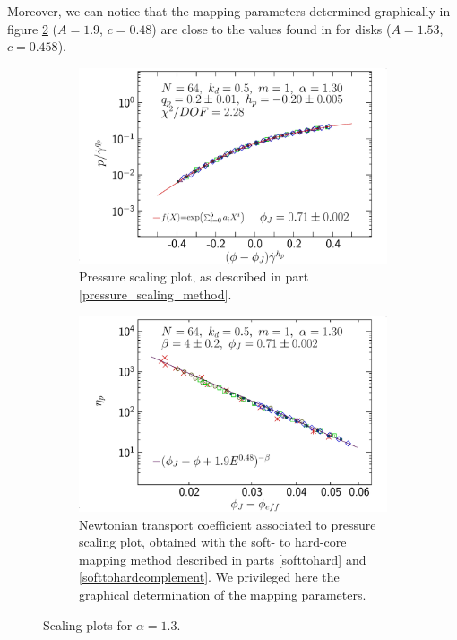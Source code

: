 \documentclass[class=report, float=false, crop=false]{standalone}
\begin{document}
Moreover, we can notice that the mapping parameters determined graphically in figure \ref{etap-phieff_graph_0064_KDk500_Ml100_EL130} ($A=1.9$, $c=0.48$) are close to the values found in \cite{PRL109.108001} for disks ($A=1.53$, $c=0.458$).

\vspace{50pt} %

\begin{figure}[h!]
\centering
    \begin{subfigure}[t]{0.49\textwidth}
        \centering
        \includegraphics[width=\textwidth]{figures/figs/p-dphi-scale_0064_KDk500_Ml100_EL130}
        \caption{Pressure scaling plot, as described in part \ref{pressure_scaling_method}.}
        \label{p-dphi-scale_0064_KDk500_Ml100_EL130}
    \end{subfigure}
    \hfill
    \begin{subfigure}[t]{0.49\textwidth}
        \centering
        \includegraphics[width=\textwidth]{figures/figs/etap-phieff_graph_0064_KDk500_Ml100_EL130}
        \caption{Newtonian transport coefficient associated to pressure scaling plot, obtained with the soft- to hard-core mapping method described in parts \ref{softtohard} and \ref{softtohardcomplement}. We privileged here the graphical determination of the mapping parameters.}
        \label{etap-phieff_graph_0064_KDk500_Ml100_EL130}
    \end{subfigure}
    \caption{Scaling plots for $\alpha=1.3$.}
    \label{scaling_effectiveness_0064}
\end{figure}
\end{document}
